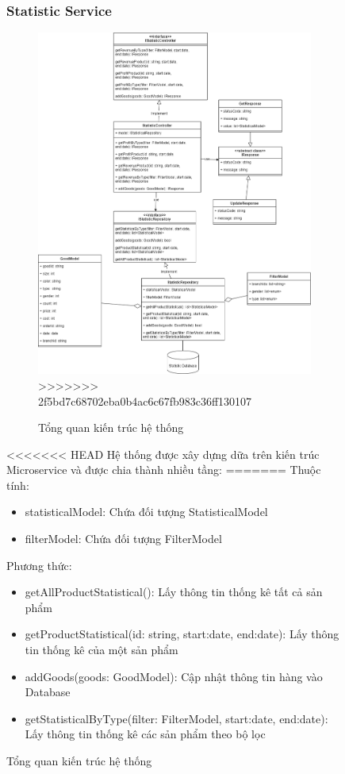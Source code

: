 \begin{figure}[!htp]
\subsubsection{Statistic Service}
\begin{figure}[!htp]
	\centering
	\includegraphics[width=11cm]{img/Architecture/service/StatisticService.png}
>>>>>>> 2f5bd7c68702eba0b4ac6c67fb983c36ff130107
	\newline
	\caption{Tổng quan kiến trúc hệ thống}
\end{figure}

<<<<<<< HEAD
Hệ thống được xây dựng dữa trên kiến trúc Microservice và được chia thành nhiều tầng:
=======
Thuộc tính:
\begin{itemize}
	\item statisticalModel: Chứa đối tượng StatisticalModel
	\item filterModel: Chứa đối tượng FilterModel
\end{itemize}
Phương thức:
\begin{itemize}
	\item getAllProductStatistical(): Lấy thông tin thống kê tất cả sản phẩm
	\item getProductStatistical(id: string, start:date,
	end:date): Lấy thông tin thống kê của một sản phẩm
	\item addGoods(goods: GoodModel): Cập nhật thông tin hàng vào Database
	\item getStatisticalByType(filter: FilterModel, start:date,
	end:date): Lấy thông tin thống kê các sản phẩm theo bộ lọc
\end{itemize}


\end{figure}
